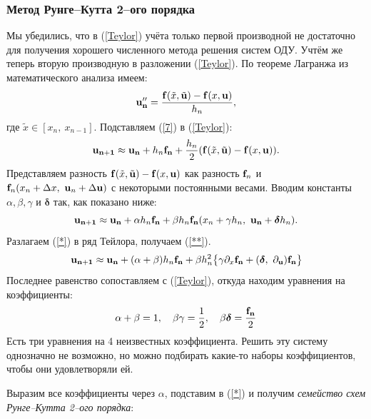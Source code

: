 \documentclass[a4paper,9pt,russian]{article}
\begin{document}
\subsubsection{Метод Рунге--Кутта 2--ого порядка}
    Мы убедились, что в (\ref{Teylor}) учёта только первой производной не достаточно для получения хорошего численного метода решения систем ОДУ. Учтём же теперь вторую производную в разложении (\ref{Teylor}). По теореме Лагранжа \cite{wiki_l} из математического анализа имеем:
    \begin{equation}\label{7}
        {\bf u_{n}''} = \frac{{\bf f}(\tilde x, \tilde {\bf u}) - {\bf f}( x, {\bf u})}{h_n},
    \end{equation}
    где $\tilde x \in[ x_n,\ x_{n-1}]$. Подставляем (\ref{7}) в (\ref{Teylor}):
    \begin{equation*}
     {\bf u_{n+1}} \approx {\bf u_{n}} + h_n{\bf f_n}     +
    \frac{h_n}{2}\qty({\bf f}(\tilde x, \tilde {\bf u}) - {\bf f}( x, {\bf u})).
    \end{equation*}  
    Представляем разность ${\bf f}(\tilde x, \tilde {\bf u}) - {\bf f}( x, {\bf u})$ как разность $\vb{f}_n$ и $\vb{f}_n\qty(x_n + \Delta x,\ \vb u_n + \Delta \vb u)$ с некоторыми постоянными весами. Вводим константы $\alpha, \beta, \gamma$ и $\boldsymbol{\delta}$ так, как показано ниже:    
    \begin{equation}\label{*}
        {\bf u_{n+1}} \approx {\bf u_{n}} + \alpha h_n {\bf f_{n}} + \beta {h_n} {\bf f_{n}}(x_n+\gamma h_n,\ {\bf u_{n}} + \boldsymbol{\delta} h_n).
    \end{equation}
    Разлагаем (\ref{*}) в ряд Тейлора, получаем (\ref{**}). 
    \begin{equation}\label{**}
        {\bf u_{n+1}} \approx {\bf u_{n}} + (\alpha + \beta) h_n {\bf f_{n}} + \beta h_n^2 \bigl\{ \gamma \partial_x {\bf f_n} + (\boldsymbol{\delta},\ \partial_{\bf u}) {\bf f_n} \bigr\}
    \end{equation}
    Последнее равенство сопоставляем с (\ref{Teylor}), откуда находим уравнения на коэффициенты:
    \[
        \alpha + \beta = 1,\quad \beta \gamma = \frac12,\quad \beta \boldsymbol{\delta} = \frac{\bf f_n}2
    \]
    Есть три уравнения на 4 неизвестных коэффициента. Решить эту систему однозначно не возможно, но можно подбирать какие-то наборы коэффициентов, чтобы они удовлетворяли ей. \par
    Выразим все коэффициенты через $\alpha$, подставим в (\ref{*}) и получим {\it семейство схем Рунге--Кутта 2--ого порядка}:
    
\end{document}
